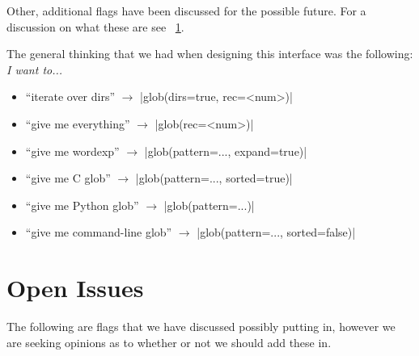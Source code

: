 \documentclass{article}
\begin{document}
Other, additional flags have been discussed for the possible future. For a discussion
on what these are see ~\ref{s:open_issues}.

The general thinking that we had when designing this interface was the following:
\emph{I want to...}
\begin{itemize}
\item ``iterate over dirs'' $\to$ |glob(dirs=true, rec=<num>)|
\item ``give me everything'' $\to$ |glob(rec=<num>)|
\item ``give me wordexp'' $\to$ |glob(pattern=..., expand=true)|
\item ``give me C glob'' $\to$ |glob(pattern=..., sorted=true)|
\item ``give me Python glob'' $\to$ |glob(pattern=...)|
\item ``give me command-line glob''  $\to$ |glob(pattern=..., sorted=false)|
\end{itemize}

\section{Open Issues}\label{s:open_issues}
The following are flags that we have discussed possibly putting in, however we are
seeking opinions as to whether or not we should add these in.
\end{document}
